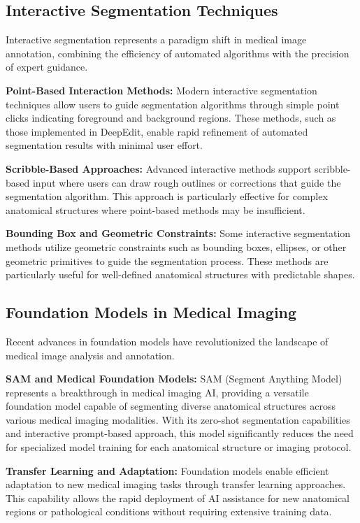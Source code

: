 \subsection{Interactive Segmentation Techniques}

Interactive segmentation represents a paradigm shift in medical image annotation, combining the efficiency of automated algorithms with the precision of expert guidance.

\textbf{Point-Based Interaction Methods:} Modern interactive segmentation techniques allow users to guide segmentation algorithms through simple point clicks indicating foreground and background regions. These methods, such as those implemented in DeepEdit, enable rapid refinement of automated segmentation results with minimal user effort.

\textbf{Scribble-Based Approaches:} Advanced interactive methods support scribble-based input where users can draw rough outlines or corrections that guide the segmentation algorithm. This approach is particularly effective for complex anatomical structures where point-based methods may be insufficient.

\textbf{Bounding Box and Geometric Constraints:} Some interactive segmentation methods utilize geometric constraints such as bounding boxes, ellipses, or other geometric primitives to guide the segmentation process. These methods are particularly useful for well-defined anatomical structures with predictable shapes.

\subsection{Foundation Models in Medical Imaging}

Recent advances in foundation models have revolutionized the landscape of medical image analysis and annotation.

\textbf{SAM and Medical Foundation Models:} SAM (Segment Anything Model) represents a breakthrough in medical imaging AI, providing a versatile foundation model capable of segmenting diverse anatomical structures across various medical imaging modalities. With its zero-shot segmentation capabilities and interactive prompt-based approach, this model significantly reduces the need for specialized model training for each anatomical structure or imaging protocol.

\textbf{Transfer Learning and Adaptation:} Foundation models enable efficient adaptation to new medical imaging tasks through transfer learning approaches. This capability allows the rapid deployment of AI assistance for new anatomical regions or pathological conditions without requiring extensive training data.

